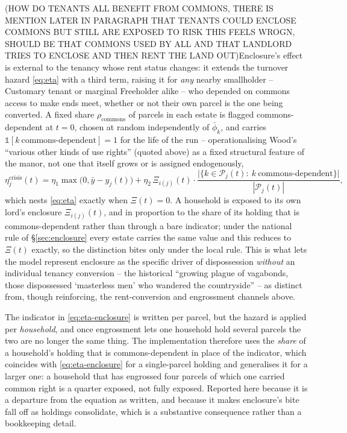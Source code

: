 \documentclass[11pt,english]{article}
\begin{document}
(HOW DO TENANTS ALL BENEFIT FROM COMMONS, THERE IS MENTION LATER IN PARAGRAPH THAT TENANTS COULD ENCLOSE COMMONS BUT STILL ARE EXPOSED TO RISK THIS FEELS WROGN, SHOULD BE THAT COMMONS USED BY ALL AND THAT LANDLORD TRIES TO ENCLOSE AND THEN RENT THE LAND OUT)Enclosure's effect is external to the tenancy whose rent status changes: it extends the turnover hazard \eqref{eq:eta} with a third term, raising it for \emph{any} nearby smallholder -- Customary tenant or marginal Freeholder alike -- who depended on commons access to make ends meet, whether or not their own parcel is the one being converted. A fixed share $\rho_{\text{commons}}$ of parcels in each estate is flagged commons-dependent at $t=0$, chosen at random independently of $\bar\phi_k$, and carries $\mathbb{1}[k\ \text{commons-dependent}]=1$ for the life of the run -- operationalising Wood's ``various other kinds of use rights'' (quoted above) as a fixed structural feature of the manor, not one that itself grows or is assigned endogenously,
\begin{equation}
\eta_j^{\text{crisis}}(t) = \eta_1\max\!\big(0,\bar y-y_j(t)\big) + \eta_2\,\Xi_{i(j)}(t)\cdot\frac{\big|\{k\in\mathcal{P}_j(t):\ k\ \text{commons-dependent}\}\big|}{|\mathcal{P}_j(t)|},
\label{eq:eta-enclosure}
\end{equation}
which nests \eqref{eq:eta} exactly when $\Xi(t)=0$. A household is exposed to its own lord's enclosure $\Xi_{i(j)}(t)$, and in proportion to the share of its holding that is commons-dependent rather than through a bare indicator; under the national rule of \S\ref{sec:enclosure} every estate carries the same value and this reduces to $\Xi(t)$ exactly, so the distinction bites only under the local rule.
This is what lets the model represent enclosure as the specific driver of dispossession \emph{without} an individual tenancy conversion -- the historical ``growing plague of vagabonds, those dispossessed `masterless men' who wandered the countryside'' \cite[p.108-109]{wood2002origin} -- as distinct from, though reinforcing, the rent-conversion and engrossment channels above.

The indicator in \eqref{eq:eta-enclosure} is written per parcel, but the hazard is applied per \emph{household}, and once engrossment lets one household hold several parcels the two are no longer the same thing. The implementation therefore uses the \emph{share} of a household's holding that is commons-dependent in place of the indicator, which coincides with \eqref{eq:eta-enclosure} for a single-parcel holding and generalises it for a larger one: a household that has engrossed four parcels of which one carried common right is a quarter exposed, not fully exposed. Reported here because it is a departure from the equation as written, and because it makes enclosure's bite fall off as holdings consolidate, which is a substantive consequence rather than a bookkeeping detail.
\end{document}
